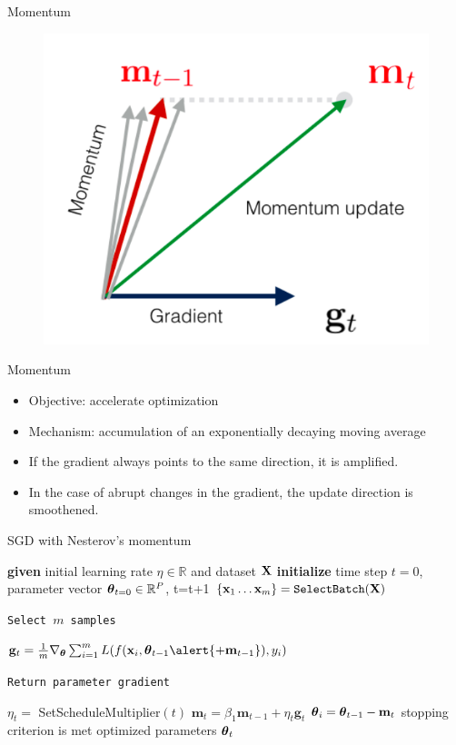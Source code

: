 \documentclass[handout,xcolor=pdftex,dvipsnames,table,mathserif]{beamer}
\begin{document}
\begin{frame}{Momentum}
\begin{figure}
\includegraphics[width=.95\columnwidth]{../graphics/Momentum}
\end{figure}
\end{frame}

\begin{frame}{Momentum}
\begin{itemize}
	\item Objective: accelerate optimization
	\item Mechanism: accumulation of an exponentially decaying moving average
	\item If the gradient always points to the same direction, it is amplified.
	\item In the case of abrupt changes in the gradient, the update direction is smoothened. 
\end{itemize}
\end{frame}


\begin{frame}{SGD with Nesterov's momentum \cite{Nesterov83}}
\begin{algorithm}[H]
\begin{algorithmic}[1]
\STATE \textbf{given} initial learning rate $\eta \in \mathbb{R}$ and dataset $\mathbf{X}$
\STATE \textbf{initialize} time step $t=0$, parameter vector $\boldsymbol{\theta}_{t=0} \in \mathbb{R}^P$,
\REPEAT
\STATE t=t+1
\STATE $\{\mathbf{x}_1 \ldots \mathbf{x}_m\}=\texttt{SelectBatch} (\mathbf{X})$ \begin{tiny}\texttt{Select $m$ samples} \end{tiny}
\STATE $\mathbf{g}_t = \frac{1}{m} \nabla_{\param} \sum_{i=1}^m \loss(f(\x_i,\param_{t-1}\alert{+\mathbf{m}_{t-1}}), y_i)$  \begin{tiny}\texttt{Return parameter gradient}\end{tiny}
\STATE $\eta_t = $ SetScheduleMultiplier$(t)$ 
\STATE $\mathbf{m}_t = \beta_1 \mathbf{m}_{t-1} + \eta_{t} \mathbf{g}_t $
\STATE $\boldsymbol{\theta}_i=\boldsymbol{\theta}_{t-1} - \mathbf{m}_{t}$
\UNTIL stopping criterion is met
\RETURN optimized parameters $\boldsymbol{\theta}_t$
\end{algorithmic}
\caption{SGD with Nesterov's momentum}
\label{alg:Nesterov}
\end{algorithm}
\end{frame}
\end{document}
